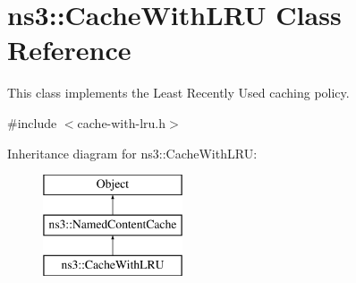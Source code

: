 \hypertarget{classns3_1_1CacheWithLRU}{\section{ns3\-:\-:Cache\-With\-L\-R\-U Class Reference}
\label{classns3_1_1CacheWithLRU}
}


This class implements the Least Recently Used caching policy.  




{\ttfamily \#include $<$cache-\/with-\/lru.\-h$>$}

Inheritance diagram for ns3\-:\-:Cache\-With\-L\-R\-U\-:\begin{figure}[H]
\begin{center}
\leavevmode
\includegraphics[height=3.000000cm]{classns3_1_1CacheWithLRU}
\end{center}
\end{figure}
